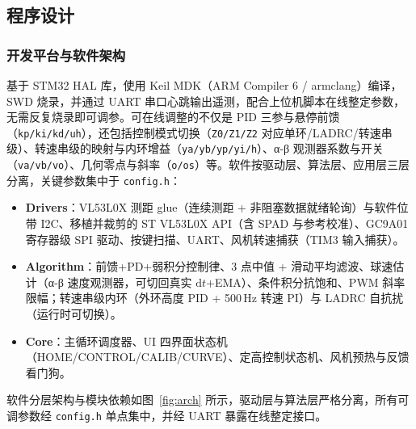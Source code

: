 \documentclass[12pt,a4paper]{ctexart}
\begin{document}
\subsection{程序设计}

\subsubsection{开发平台与软件架构}
基于 STM32 HAL 库，使用 Keil MDK（ARM Compiler 6 / armclang）编译，SWD 烧录，并通过 UART 串口心跳输出遥测，配合上位机脚本在线整定参数，无需反复烧录即可调参。可在线调整的不仅是 PID 三参与悬停前馈（\texttt{kp/ki/kd/uh}），还包括控制模式切换（\texttt{Z0/Z1/Z2} 对应单环/LADRC/转速串级）、转速串级的映射与内环增益（\texttt{ya/yb/yp/yi/h}）、α-β 观测器系数与开关（\texttt{va/vb/vo}）、几何零点与斜率（\texttt{o/os}）等。软件按驱动层、算法层、应用层三层分离，关键参数集中于 \texttt{config.h}：
\begin{itemize}[leftmargin=2em,itemsep=2pt]
  \item \textbf{Drivers}：VL53L0X 测距 glue（连续测距 + 非阻塞数据就绪轮询）与软件位带 I2C、移植并裁剪的 ST VL53L0X API（含 SPAD 与参考校准）、GC9A01 寄存器级 SPI 驱动、按键扫描、UART、风机转速捕获（TIM3 输入捕获）。
  \item \textbf{Algorithm}：前馈+PD+弱积分控制律、3 点中值 + 滑动平均滤波、球速估计（α-β 速度观测器，可切回真实 $\mathrm{d}t$+EMA）、条件积分抗饱和、PWM 斜率限幅；转速串级内环（外环高度 PID + 500\,Hz 转速 PI）与 LADRC 自抗扰（运行时可切换）。
  \item \textbf{Core}：主循环调度器、UI 四界面状态机（HOME/CONTROL/CALIB/CURVE）、定高控制状态机、风机预热与反馈看门狗。
\end{itemize}

软件分层架构与模块依赖如图~\ref{fig:arch} 所示，驱动层与算法层严格分离，所有可调参数经 \texttt{config.h} 单点集中，并经 UART 暴露在线整定接口。
\end{document}
